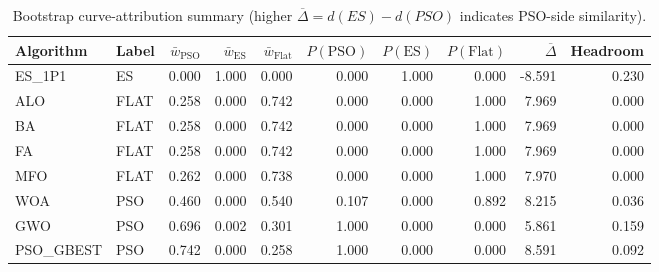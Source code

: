 \begin{table}
\caption{Bootstrap curve-attribution summary (higher $\overline{\Delta}=d(ES)-d(PSO)$ indicates PSO-side similarity). }
\label{tab:bootstrap_membership}
\begin{tabular}{llrrrrrrrr}
\toprule
Algorithm & Label & $\bar w_{\mathrm{PSO}}$ & $\bar w_{\mathrm{ES}}$ & $\bar w_{\mathrm{Flat}}$ & $P(\mathrm{PSO})$ & $P(\mathrm{ES})$ & $P(\mathrm{Flat})$ & $\overline{\Delta}$ & Headroom \\
\midrule
ES_1P1 & ES & 0.000 & 1.000 & 0.000 & 0.000 & 1.000 & 0.000 & -8.591 & 0.230 \\
ALO & FLAT & 0.258 & 0.000 & 0.742 & 0.000 & 0.000 & 1.000 & 7.969 & 0.000 \\
BA & FLAT & 0.258 & 0.000 & 0.742 & 0.000 & 0.000 & 1.000 & 7.969 & 0.000 \\
FA & FLAT & 0.258 & 0.000 & 0.742 & 0.000 & 0.000 & 1.000 & 7.969 & 0.000 \\
MFO & FLAT & 0.262 & 0.000 & 0.738 & 0.000 & 0.000 & 1.000 & 7.970 & 0.000 \\
WOA & PSO & 0.460 & 0.000 & 0.540 & 0.107 & 0.000 & 0.892 & 8.215 & 0.036 \\
GWO & PSO & 0.696 & 0.002 & 0.301 & 1.000 & 0.000 & 0.000 & 5.861 & 0.159 \\
PSO_GBEST & PSO & 0.742 & 0.000 & 0.258 & 1.000 & 0.000 & 0.000 & 8.591 & 0.092 \\
\bottomrule
\end{tabular}
\end{table}
